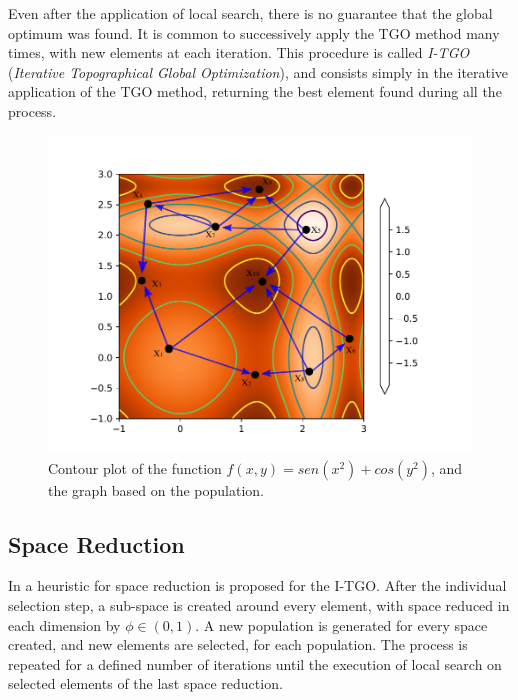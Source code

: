 Even after the application of local search, there is no guarantee that the global optimum was found. It is common to successively apply the TGO method many times, with new elements at each iteration. This procedure is called \textit{I-TGO} (\textit{Iterative Topographical Global Optimization}), and consists simply in the iterative application of the TGO method, returning the best element found during all the process.



\begin{figure}[tp]
\begin{center}
\includegraphics[scale=0.6]{fig_1.pdf}
\end{center}
\captionsetup{justification=centering}
\vspace*{-7mm} 
\caption{Contour plot of the function $f(x, y) = sen(x^2) + cos(y^2)$, and the graph based on the population.}\label{fig:Graph}
\end{figure}


\subsection{Space Reduction}

In \cite{ITGO4} a heuristic for space reduction is proposed for the I-TGO. After the individual selection step, a sub-space is created around every element, with space reduced in each dimension by $\phi \in (0, 1)$. A new population is generated for every space created, and new elements are selected, for each population. The process is repeated for a defined number of iterations until the execution of local search on selected elements of the last space reduction.

